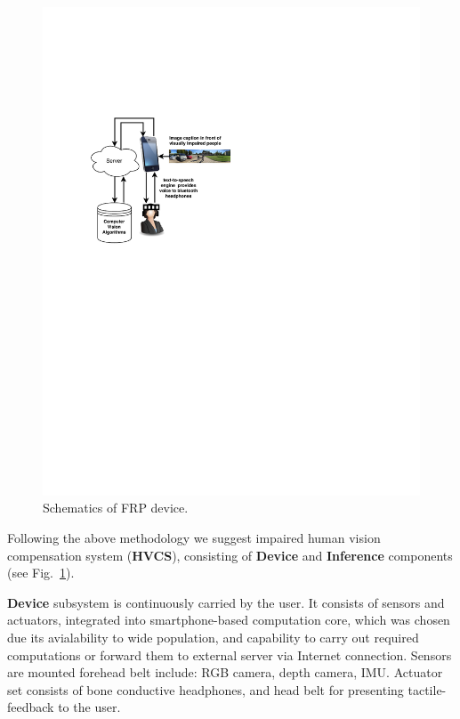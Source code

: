 \documentclass[a4paper,11pt]{article}
\begin{document}
\begin{figure}
  \begin{center}
    \includegraphics[scale=0.7]{./img/SmartDevice_diagram.pdf}  
  \end{center}
  \caption{Schematics of FRP device.}
  \label{fig:schematics}
\end{figure}

Following the above methodology we suggest impaired human vision compensation system (\textbf{HVCS}), consisting of \textbf{Device} and \textbf{Inference} components (see Fig.~\ref{fig:schematics}).

\textbf{Device} subsystem is continuously carried by the user. It consists of sensors and actuators, integrated into smartphone-based computation core, which was chosen due its avialability to wide population, and capability to carry out required computations or forward them to external server via Internet connection. Sensors are mounted forehead belt include: RGB camera, depth camera, IMU. Actuator set consists of bone conductive headphones, and head belt for presenting tactile-feedback to the user. %
\end{document}
